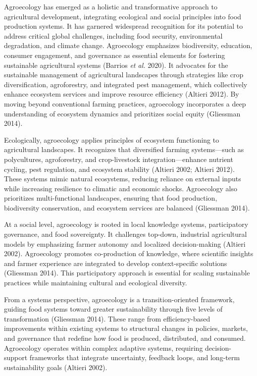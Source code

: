 \documentclass[
]{article}
\begin{document}
Agroecology has emerged as a holistic and transformative approach to
agricultural development, integrating ecological and social principles
into food production systems. It has garnered widespread recognition for
its potential to address critical global challenges, including food
security, environmental degradation, and climate change. Agroecology
emphasizes biodiversity, education, consumer engagement, and governance
as essential elements for fostering sustainable agricultural systems
(Barrios \emph{et al.} 2020). It advocates for the sustainable
management of agricultural landscapes through strategies like crop
diversification, agroforestry, and integrated pest management, which
collectively enhance ecosystem services and improve resource efficiency
(Altieri 2012). By moving beyond conventional farming practices,
agroecology incorporates a deep understanding of ecosystem dynamics and
prioritizes social equity (Gliessman 2014).

Ecologically, agroecology applies principles of ecosystem functioning to
agricultural landscapes. It recognizes that diversified farming
systems---such as polycultures, agroforestry, and crop-livestock
integration---enhance nutrient cycling, pest regulation, and ecosystem
stability (Altieri 2002; Altieri 2012). These systems mimic natural
ecosystems, reducing reliance on external inputs while increasing
resilience to climatic and economic shocks. Agroecology also prioritizes
multi-functional landscapes, ensuring that food production, biodiversity
conservation, and ecosystem services are balanced (Gliessman 2014).

At a social level, agroecology is rooted in local knowledge systems,
participatory governance, and food sovereignty. It challenges top-down,
industrial agricultural models by emphasizing farmer autonomy and
localized decision-making (Altieri 2002). Agroecology promotes
co-production of knowledge, where scientific insights and farmer
experience are integrated to develop context-specific solutions
(Gliessman 2014). This participatory approach is essential for scaling
sustainable practices while maintaining cultural and ecological
diversity.

From a systems perspective, agroecology is a transition-oriented
framework, guiding food systems toward greater sustainability through
five levels of transformation (Gliessman 2014). These range from
efficiency-based improvements within existing systems to structural
changes in policies, markets, and governance that redefine how food is
produced, distributed, and consumed. Agroecology operates within complex
adaptive systems, requiring decision-support frameworks that integrate
uncertainty, feedback loops, and long-term sustainability goals (Altieri
2002).
\end{document}
